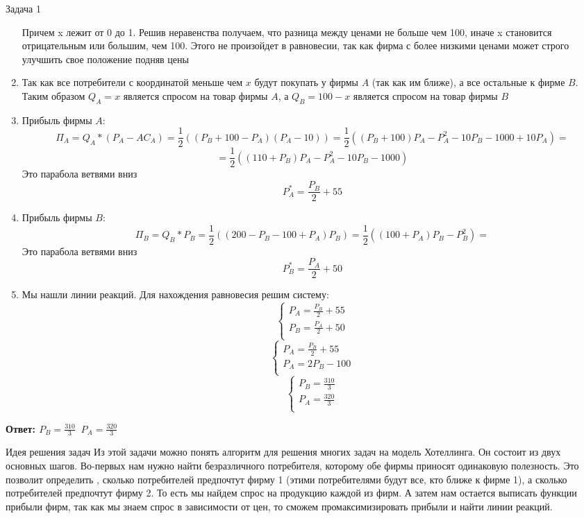 \begin{mybox}{Задача 1}
\begin{enumerate}
        Причем x лежит от 0 до 1. Решив неравенства получаем, что разница между ценами не больше чем 100, иначе x
        становится отрицательным или большим, чем 100. Этого не произойдет в равновесии, так как фирма с более
        низкими ценами может строго улучшить свое положение подняв цены
        \item Так как все потребители с координатой меньше чем $x$ будут покупать у фирмы $A$ (так как им ближе), а все
        остальные к фирме $B$. Таким образом $Q_A=x$ является спросом на товар фирмы $A$, а $Q_B=100-x$ является
        спросом на товар фирмы $B$
        \item Прибыль фирмы $A$:
        $$\Pi_A=Q_A*(P_A-AC_A)=\frac{1}{2}((P_B+100-P_A)(P_A-10))=\frac{1}{2}((P_B+100)P_A-P_A^2-10P_B-1000+10P_A)=$$
        $$=\frac{1}{2}((110+P_B)P_A-P_A^2-10P_B-1000)$$
        Это парабола ветвями вниз
        $$P_A^*=\frac{P_B}{2}+55$$
        \item Прибыль фирмы $B$:
        $$\Pi_B=Q_B*P_B=\frac{1}{2}((200-P_B-100+P_A)P_B)=\frac{1}{2}((100+P_A)P_B-P_B^2)=$$
        Это парабола ветвями вниз
        $$P_B^*=\frac{P_A}{2}+50$$
        \item Мы нашли линии реакций. Для нахождения равновесия решим систему:
        $$\begin{cases}
            P_A=\frac{P_B}{2}+55 \\
            P_B=\frac{P_A}{2}+50 \\
        \end{cases}$$
        $$\begin{cases}
            P_A=\frac{P_B}{2}+55 \\
            P_A=2P_B-100 \\
        \end{cases}$$
        $$\begin{cases}
            P_B=\frac{310}{3} \\
            P_A=\frac{320}{3} \\
        \end{cases}$$
    \end{enumerate}
    \textbf{Ответ: $P_B=\frac{310}{3}\;\;P_A=\frac{320}{3}$}
\end{mybox}

\begin{mybox}{Идея решения задач}
    \indent\setlength{\parindent}{1em}\indent\setlength{\parindent}{1em}Из этой задачи можно понять алгоритм для решения многих задач на модель Хотеллинга. Он состоит из двух основных
    шагов. Во-первых нам
    нужно найти безразличного потребителя, которому обе фирмы приносят одинаковую полезность. Это позволит определить
    , сколько потребителей предпочтут фирму 1 (этими потребителями будут все, кто ближе к фирме 1), а сколько
    потребителей предпочтут фирму 2. То есть мы найдем спрос на продукцию каждой из фирм. А затем нам остается выписать
    функции прибыли фирм, так как мы знаем спрос в зависимости от цен, то сможем промаксимизировать прибыли и найти
    линии реакций.
\end{mybox}

